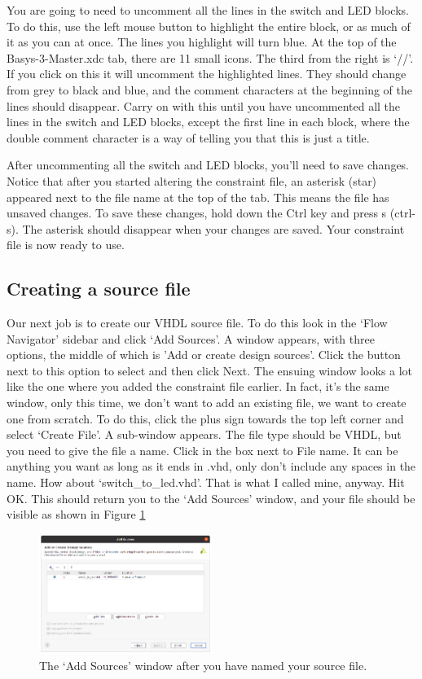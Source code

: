 \documentclass[../physical_computing.tex]{subfiles}
\begin{document}
You are going to need to uncomment all the lines in the switch and LED blocks. To do this, use the left mouse button to highlight the entire block, or as much of it as you can at once. The lines you highlight will turn blue. At the top of the Basys-3-Master.xdc tab, there are 11 small icons. The third from the right is `//'. If you click on this it will uncomment the highlighted lines. They should change from grey to black and blue, and the comment characters at the beginning of the lines should disappear. Carry on with this until you have uncommented all the lines in the switch and LED blocks, except the first line in each block, where the double comment character is a way of telling you that this is just a title.

After uncommenting all the switch and LED blocks, you'll need to save changes. Notice that after you started altering the constraint file, an asterisk (star) appeared next to the file name at the top of the tab. This means the file has unsaved changes. To save these changes, hold down the Ctrl key and press s (ctrl-s). The asterisk should disappear when your changes are saved. Your constraint file is now ready to use.

\subsection{Creating a source file}
\label{sec:sourcefile}

Our next job is to create our VHDL source file. To do this look in the `Flow Navigator' sidebar and click `Add Sources'. A window appears, with three options, the middle of which is 'Add or create design sources'. Click the button next to this option to select and then click Next. The ensuing window looks a lot like the one where you added the constraint file earlier. In fact, it's the same window, only this time, we don't want to add an existing file, we want to create one from scratch. To do this, click the plus sign towards the top left corner and select `Create File'. A sub-window appears. The file type should be VHDL, but you need to give the file a name. Click in the box next to File name. It can be anything you want as long as it ends in .vhd, only don't include any spaces in the name. How about `switch\_to\_led.vhd'. That is what I called mine, anyway. Hit OK. This should return you to the `Add Sources' window, and your file should be visible as shown in Figure \ref{fig:add_sources}

\begin{figure}[htbp]
    \centering
    \includegraphics[width=0.5\textwidth]{chapter_1/figures/add_sources.png}
    \caption{The `Add Sources' window after you have named your source file.}
    \label{fig:add_sources}
\end{figure}
\end{document}
